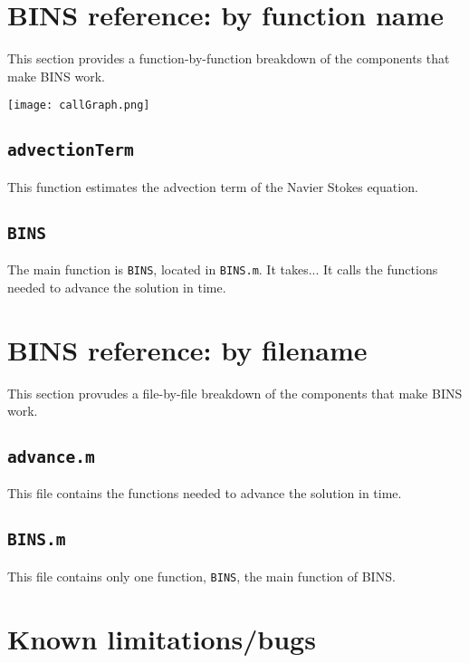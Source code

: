 \documentclass[12pt]{article}
\begin{document}
\section{BINS reference: by function name}
This section provides a function-by-function breakdown of the components that make BINS work.

\texttt{[image: callGraph.png]} 

\subsection{\texttt{advectionTerm}}
This function estimates the advection term of the Navier Stokes equation.

\subsection{\texttt{BINS}}
The main function is \texttt{BINS}, located in \texttt{BINS.m}.  It takes...  It calls the functions needed to advance the solution in time.

\section{BINS reference: by filename}
This section provudes a file-by-file breakdown of the components that make BINS work.

\subsection{\texttt{advance.m}}
This file contains the functions needed to advance the solution in time.

\subsection{\texttt{BINS.m}}
This file contains only one function, \texttt{BINS}, the main function of BINS.

\section{Known limitations/bugs}
\end{document}
